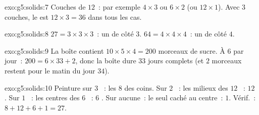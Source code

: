 \begin{solution}{exo:g5:solids:7}
Couches de $12$~: par exemple $4 \times 3$ ou $6 \times 2$ (ou
$12 \times 1$). Avec $3$ couches, le  est
$12 \times 3 = 36$  dans tous les cas.
\end{solution}

\begin{solution}{exo:g5:solids:8}
$27 = 3 \times 3 \times 3$~: un  de côté $3$.
$64 = 4 \times 4 \times 4$~: un  de côté $4$.
\end{solution}

\begin{solution}{exo:g5:solids:9}
La boîte contient $10 \times 5 \times 4 = 200$ morceaux de sucre.
À $6$ par jour~: $200 = 6 \times 33 + 2$, donc la boîte dure
$33$ jours complets (et $2$ morceaux restent pour le matin du jour
$34$).
\end{solution}

\begin{solution}{exo:g5:solids:10}
Peinture sur $3$ ~: les $8$  des coins. Sur $2$ ~:
les milieux des $12$ ~: $12$ . Sur $1$ ~: les
centres des $6$ ~: $6$ . Sur aucune~: le seul 
caché au centre~: $1$. Vérif.~: $8 + 12 + 6 + 1 = 27$. \checkmark
\end{solution}
